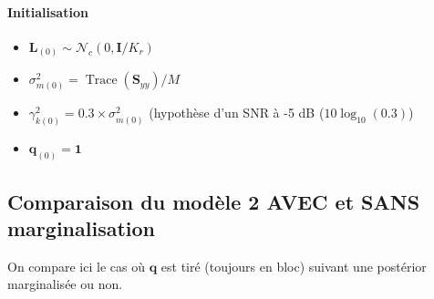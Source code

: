 \documentclass[ 12pt]{article}
\newcommand{\tr}[1]{\operatorname{Trace}\!\left(#1\right)}
\begin{document}
\paragraph{Initialisation}
\begin{itemize}
        \item $\bm{L}_{(0)} \sim \mathcal{N}_c(0,\bm{I}/K_r)$
	\item $\sigma_{m(0)}^2=\tr{\bm{S}_{yy}}/M$
        \item  $\gamma_{k(0)}^2=0.3 \times \sigma_{m(0)}^2$ (hypothèse d'un SNR à -5 dB ($10\log_{10}(0.3)$)
        \item $\bm{q}_{(0)}=\bm{1}$ 
\end{itemize}

\subsection{Comparaison du modèle 2 AVEC et SANS marginalisation}
On compare ici le cas où $\bm{q}$ est tiré (toujours en bloc) suivant une postérior marginalisée ou non.
\end{document}
